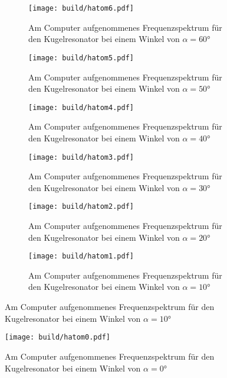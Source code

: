 \begin{figure}
  \centering
  \begin{subfigure}{0.49\textwidth}
    \centering
    \texttt{[image: build/hatom6.pdf]}
    \caption{Am Computer aufgenommenes Frequenzspektrum für den Kugelresonator bei
    einem Winkel von $\alpha=60°$}
    \label{fig:hatom6}
  \end{subfigure}
  \begin{subfigure}{0.49\textwidth}
    \centering
    \texttt{[image: build/hatom5.pdf]}
    \caption{Am Computer aufgenommenes Frequenzspektrum für den Kugelresonator bei
    einem Winkel von $\alpha=50°$}
    \label{fig:hatom5}
  \end{subfigure}
  \begin{subfigure}{0.49\textwidth}
    \centering
    \texttt{[image: build/hatom4.pdf]}
    \caption{Am Computer aufgenommenes Frequenzspektrum für den Kugelresonator bei
    einem Winkel von $\alpha=40°$}
    \label{fig:hatom4}
  \end{subfigure}
  \begin{subfigure}{0.49\textwidth}
    \centering
    \texttt{[image: build/hatom3.pdf]}
    \caption{Am Computer aufgenommenes Frequenzspektrum für den Kugelresonator bei
    einem Winkel von $\alpha=30°$}
    \label{fig:hatom3}
  \end{subfigure}
  \begin{subfigure}{0.49\textwidth}
    \centering
    \texttt{[image: build/hatom2.pdf]}
    \caption{Am Computer aufgenommenes Frequenzspektrum für den Kugelresonator bei
    einem Winkel von $\alpha=20°$}
    \label{fig:hatom2}
  \end{subfigure}
  \begin{subfigure}{0.49\textwidth}
    \centering
    \texttt{[image: build/hatom1.pdf]}
    \caption{Am Computer aufgenommenes Frequenzspektrum für den Kugelresonator bei
    einem Winkel von $\alpha=10°$}
    \label{fig:hatom1}
  \end{subfigure}
\end{figure}

\begin{figure}
  \centering
  \texttt{[image: build/hatom0.pdf]}
  \caption{Am Computer aufgenommenes Frequenzspektrum für den Kugelresonator bei
  einem Winkel von $\alpha=0°$}
  \label{fig:hatom0}
\end{figure}
